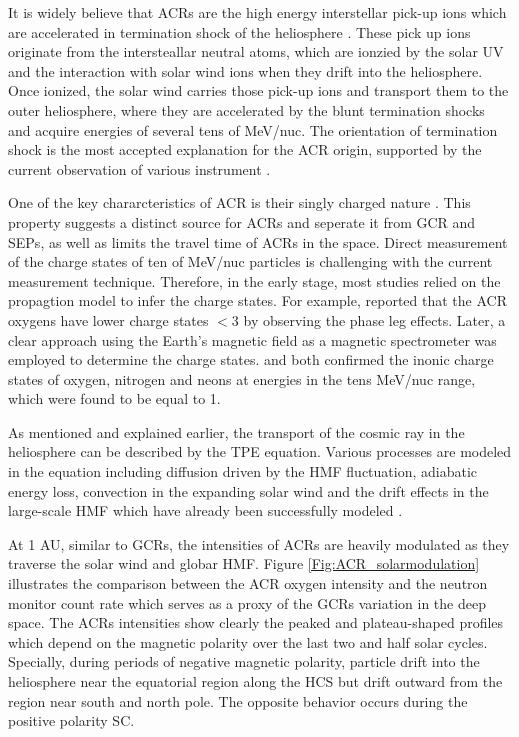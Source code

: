 It is widely believe that ACRs are the high energy interstellar pick-up ions which are accelerated in termination shock of the heliosphere \citep{Fisk1974ApJ}. These pick up ions originate from the intersteallar neutral atoms, which are ionzied by the solar UV and the interaction with solar wind ions when they drift into the heliosphere. Once ionized, the solar wind carries those pick-up ions and transport them to the outer heliosphere, where they are accelerated by the blunt termination shocks \citep{McComas2006GeoRL} and acquire energies of several tens of MeV/nuc. The orientation of termination shock is the most accepted explanation for the \ac{ACR} origin, supported by the current observation of various instrument \citep{McComas2019ApJ, Cummings2019ICRC}.

One of the key chararcteristics of \ac{ACR} is their singly charged nature \citep{Klecker1980GeoRL,Adams1991ApJ, Klecker1995ApJ}. This property suggests a distinct source for \acp{ACR} and seperate it from \ac{GCR} and \acp{SEP}, as well as limits the travel time of \acp{ACR} in the space. Direct measurement of the charge states of ten of MeV/nuc particles is challenging with the current measurement technique. Therefore, in the early stage, most studies relied on the propagtion model to infer the charge states. For example, \citet{Klecker1980GeoRL} reported that the \ac{ACR} oxygens have lower charge states $<$3 by observing the phase leg effects. Later, a clear approach using the Earth's magnetic field as a magnetic spectrometer was employed to determine the charge states. \citet{Adams1991ApJ} and \citet{Klecker1995ApJ} both confirmed the inonic charge states of oxygen, nitrogen and neons at energies in the tens MeV/nuc range, which were found to be equal to 1.

As mentioned and explained earlier, the transport of the cosmic ray in the heliosphere can be described by the \ac{TPE} equation. Various processes are modeled in the equation including diffusion driven by the \ac{HMF} fluctuation, adiabatic energy loss, convection in the expanding solar wind and the drift effects in the large-scale \ac{HMF} which have already been successfully modeled \citep{Parker1965Pss, Jokipii1977ApJ, Jokipii1981ApJ}.

At 1 AU, similar to \acp{GCR}, the intensities of \acp{ACR} are heavily modulated as they traverse the solar wind and globar \ac{HMF}. Figure \ref{Fig:ACR_solarmodulation} illustrates the comparison between the \ac{ACR} oxygen intensity and the neutron monitor count rate which serves as a proxy of the \acp{GCR} variation in the deep space. The \acp{ACR} intensities show clearly the peaked and plateau-shaped profiles which depend on the magnetic polarity over the last two and half solar cycles. Specially, during periods of negative magnetic polarity, particle drift into the heliosphere near the equatorial region along the \ac{HCS} but drift outward from the region near south and north pole. The opposite behavior occurs during the positive polarity \acl{SC}.

